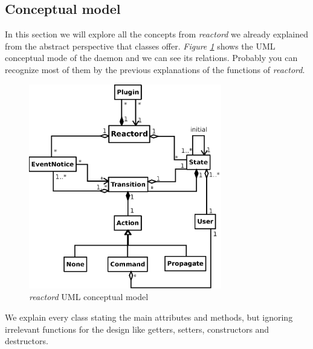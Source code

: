 \subsection{Conceptual model}
\label{sec:dcm}
In this section we will explore all the concepts from \emph{reactord} we already explained from the abstract perspective that classes 
offer. \emph{Figure \ref{fig:cmodel}} shows the UML conceptual mode of the daemon and we can see its relations. Probably you can 
recognize most of them by the previous explanations of the functions of \emph{reactord}.\\
\label{sec:concept}
\begin{figure}[h]
  \centering
  \includegraphics[width=0.75\textwidth,keepaspectratio]{img/conceptualmodel}
  \caption{\emph{reactord} UML conceptual model}
  \label{fig:cmodel}
\end{figure}
We explain every class stating the main attributes and methods, but ignoring irrelevant functions for the design like getters, setters,
constructors and destructors.
